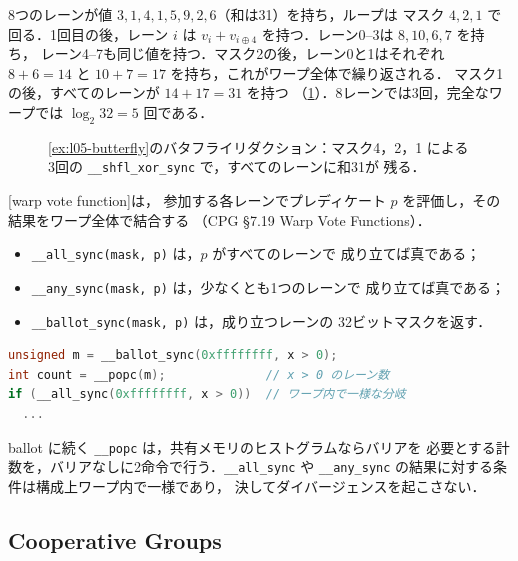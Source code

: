 \documentclass[../main.tex]{subfiles}
\begin{document}
\begin{example}[バタフライリダクション]
  \label{ex:l05-butterfly}
  8つのレーンが値 $3, 1, 4, 1, 5, 9, 2, 6$（和は31）を持ち，ループは
  マスク $4, 2, 1$ で回る．1回目の後，レーン $i$ は
  $v_i + v_{i \oplus 4}$ を持つ．レーン0--3は $8, 10, 6, 7$ を持ち，
  レーン4--7も同じ値を持つ．マスク2の後，レーン0と1はそれぞれ
  $8 + 6 = 14$ と $10 + 7 = 17$ を持ち，これがワープ全体で繰り返される．
  マスク1の後，すべてのレーンが $14 + 17 = 31$ を持つ
  （\cref{fig:l05-butterfly}）．8レーンでは3回，完全なワープでは
  $\log_2 32 = 5$ 回である．
\end{example}

\begin{figure}[tb]
  \centering
  
  \caption{\cref{ex:l05-butterfly}のバタフライリダクション：マスク4，2，1
    による3回の \texttt{\_\_shfl\_xor\_sync} で，すべてのレーンに和31が
    残る．}
  \label{fig:l05-butterfly}
\end{figure}

\begin{definition}[ワープ投票関数]
  [warp vote function]は，
  参加する各レーンでプレディケート $p$ を評価し，その結果をワープ全体で結合する
  （CPG §7.19 Warp Vote Functions）．
  \begin{itemize}
    \item \texttt{\_\_all\_sync(mask, p)} は，$p$ がすべてのレーンで
      成り立てば真である；
    \item \texttt{\_\_any\_sync(mask, p)} は，少なくとも1つのレーンで
      成り立てば真である；
    \item \texttt{\_\_ballot\_sync(mask, p)} は，成り立つレーンの
      32ビットマスクを返す．
  \end{itemize}
\end{definition}

\begin{lstlisting}[language=C++, numbers=none]
unsigned m = __ballot_sync(0xffffffff, x > 0);
int count = __popc(m);              // x > 0 のレーン数
if (__all_sync(0xffffffff, x > 0))  // ワープ内で一様な分岐
  ...
\end{lstlisting}
ballot に続く \texttt{\_\_popc} は，共有メモリのヒストグラムならバリアを
必要とする計数を，バリアなしに2命令で行う．\texttt{\_\_all\_sync} や
\texttt{\_\_any\_sync} の結果に対する条件は構成上ワープ内で一様であり，
決してダイバージェンスを起こさない．

\subsection{Cooperative Groups}
\end{document}
